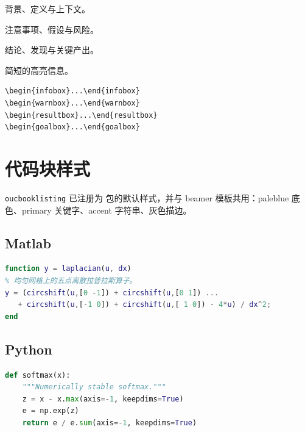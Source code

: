 \begin{fullwidth}
\begin{minipage}[t]{0.48\linewidth}
\begin{infobox}
背景、定义与上下文。
\end{infobox}
\begin{warnbox}
注意事项、假设与风险。
\end{warnbox}
\begin{resultbox}
结论、发现与关键产出。
\end{resultbox}
\begin{goalbox}
\centering 简短的高亮信息。
\end{goalbox}
\end{minipage}\hfill
\begin{minipage}[t]{0.48\linewidth}
\begin{lstlisting}[language={[LaTeX]TeX}]
\begin{infobox}...\end{infobox}
\begin{warnbox}...\end{warnbox}
\begin{resultbox}...\end{resultbox}
\begin{goalbox}...\end{goalbox}
\end{lstlisting}
\end{minipage}
\end{fullwidth}

\section{代码块样式}

\texttt{oucbooklisting} 已注册为  包的默认样式，并与 beamer 模板共用：paleblue 底色、primary 关键字、accent 字符串、灰色描边。

\subsection{Matlab}
\begin{lstlisting}[language=Matlab]
function y = laplacian(u, dx)
% 均匀网格上的五点离散拉普拉斯算子。
y = (circshift(u,[0 -1]) + circshift(u,[0 1]) ...
   + circshift(u,[-1 0]) + circshift(u,[ 1 0]) - 4*u) / dx^2;
end
\end{lstlisting}

\subsection{Python}
\begin{lstlisting}[language=Python]
def softmax(x):
    """Numerically stable softmax."""
    z = x - x.max(axis=-1, keepdims=True)
    e = np.exp(z)
    return e / e.sum(axis=-1, keepdims=True)
\end{lstlisting}

